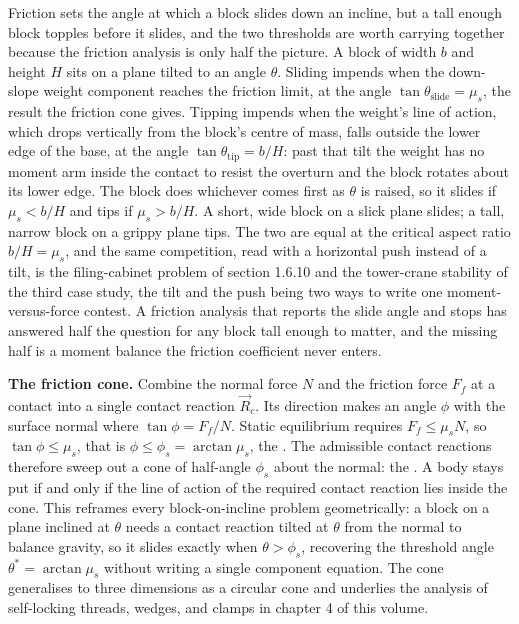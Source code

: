 Friction sets the angle at which a block slides down an incline, but a tall
enough block topples before it slides, and the two thresholds are worth carrying
together because the friction analysis is only half the picture. A block of
width $b$ and height $H$ sits on a plane tilted to an angle $\theta$. Sliding
impends when the down-slope weight component reaches the friction limit, at the
angle $\tan\theta_{\text{slide}} = \mu_s$, the result the friction cone gives.
Tipping impends when the weight's line of action, which drops vertically from
the block's centre of mass, falls outside the lower edge of the base, at the
angle $\tan\theta_{\text{tip}} = b/H$: past that tilt the weight has no moment
arm inside the contact to resist the overturn and the block rotates about its
lower edge. The block does whichever comes first as $\theta$ is raised, so it
slides if $\mu_s < b/H$ and tips if $\mu_s > b/H$. A short, wide block on a
slick plane slides; a tall, narrow block on a grippy plane tips. The two are
equal at the critical aspect ratio $b/H = \mu_s$, and the same competition, read
with a horizontal push instead of a tilt, is the filing-cabinet problem of
section 1.6.10 and the tower-crane stability of the third case study, the tilt
and the push being two ways to write one moment-versus-force contest. A friction
analysis that reports the slide angle and stops has answered half the question
for any block tall enough to matter, and the missing half is a moment balance
the friction coefficient never enters.

\begin{mastery}
\textbf{The friction cone.} Combine the normal force $N$ and the
friction force $F_f$ at a contact into a single contact reaction
$\vec{R}_c$. Its direction makes an angle $\phi$ with the surface normal
where $\tan\phi = F_f / N$. Static equilibrium requires $F_f \le \mu_s
N$, so $\tan\phi \le \mu_s$, that is $\phi \le \phi_s = \arctan\mu_s$,
the . The admissible contact reactions
therefore sweep out a cone of half-angle $\phi_s$ about the normal: the
. A body stays put if and only if the line of
action of the required contact reaction lies inside the cone. This
reframes every block-on-incline problem geometrically: a block on a
plane inclined at $\theta$ needs a contact reaction tilted at $\theta$
from the normal to balance gravity, so it slides exactly when $\theta >
\phi_s$, recovering the threshold angle $\theta^\ast = \arctan\mu_s$
without writing a single component equation. The cone generalises to
three dimensions as a circular cone and underlies the analysis of
self-locking threads, wedges, and clamps in chapter 4 of this volume.
\end{mastery}

